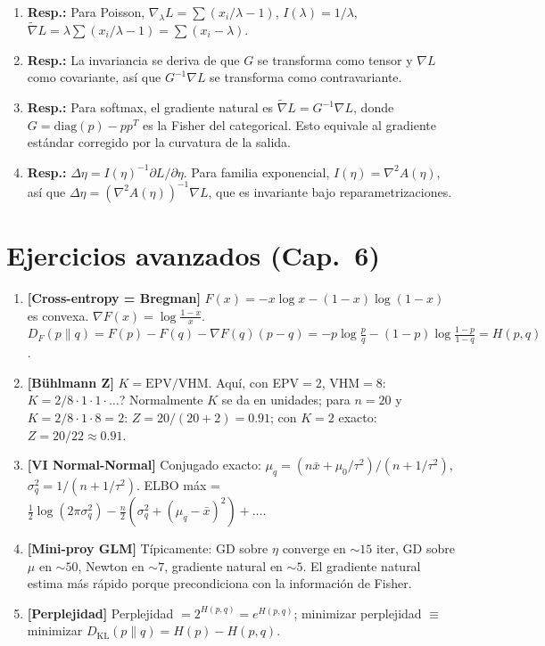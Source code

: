 \begin{enumerate}
	\item \textbf{Resp.:} Para Poisson, $\nabla_\lambda L = \sum(x_i/\lambda - 1)$, $I(\lambda) = 1/\lambda$, $\tilde{\nabla} L = \lambda \sum(x_i/\lambda - 1) = \sum(x_i - \lambda)$.
	\item \textbf{Resp.:} La invariancia se deriva de que $G$ se transforma como tensor y $\nabla L$ como covariante, así que $G^{-1}\nabla L$ se transforma como contravariante.
	\item \textbf{Resp.:} Para softmax, el gradiente natural es $\tilde{\nabla} L = G^{-1} \nabla L$, donde $G = \text{diag}(p) - pp^T$ es la Fisher del categorical.  Esto equivale al gradiente estándar corregido por la curvatura de la salida.
	\item \textbf{Resp.:} $\Delta\eta = I(\eta)^{-1} \partial L/\partial\eta$.  Para familia exponencial, $I(\eta) = \nabla^2 A(\eta)$, así que $\Delta\eta = (\nabla^2 A(\eta))^{-1} \nabla L$, que es invariante bajo reparametrizaciones.
\end{enumerate}

\section*{Ejercicios avanzados (Cap.~6)}
\begin{enumerate}
	\item \textbf{[Cross-entropy = Bregman]} $F(x)=-x\log x - (1-x)\log(1-x)$ es convexa. $\nabla F(x)=\log\frac{1-x}{x}$. $D_F(p\|q)=F(p)-F(q)-\nabla F(q)(p-q)=-p\log\frac{p}{q}-(1-p)\log\frac{1-p}{1-q}=H(p,q)$.
	\item \textbf{[B\"uhlmann Z]} $K=\mathrm{EPV}/\mathrm{VHM}$. Aqu\'i, con EPV$=2$, VHM$=8$: $K=2/8\cdot 1\cdot 1\cdot \ldots$? Normalmente $K$ se da en unidades; para $n=20$ y $K=2/8\cdot 1\cdot 8=2$: $Z=20/(20+2)=0.91$; con $K=2$ exacto: $Z=20/22\approx 0.91$.
	\item \textbf{[VI Normal-Normal]} Conjugado exacto: $\mu_q=(n\bar x+\mu_0/\tau^2)/(n+1/\tau^2)$, $\sigma_q^2=1/(n+1/\tau^2)$. ELBO m\'ax = $\tfrac{1}{2}\log(2\pi\sigma_q^2)-\tfrac{n}{2}(\sigma_q^2+(\mu_q-\bar x)^2)+\ldots$.
	\item \textbf{[Mini-proy GLM]} T\'ipicamente: GD sobre $\eta$ converge en $\sim 15$ iter, GD sobre $\mu$ en $\sim 50$, Newton en $\sim 7$, gradiente natural en $\sim 5$. El gradiente natural estima m\'as r\'apido porque precondiciona con la informaci\'on de Fisher.
	\item \textbf{[Perplejidad]} Perplejidad $=2^{H(p,q)}=e^{H(p,q)}$; minimizar perplejidad $\equiv$ minimizar $D_{\mathrm{KL}}(p\|q)=H(p)-H(p,q)$.
\end{enumerate}

